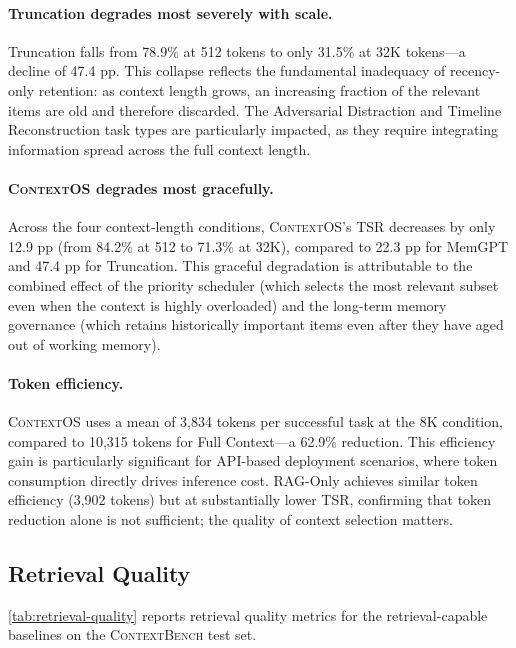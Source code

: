 \documentclass[review,12pt]{elsarticle}
\newcommand{\contextos}{\textsc{ContextOS}}
\newcommand{\contextbench}{\textsc{ContextBench}}
\begin{document}
\paragraph{Truncation degrades most severely with scale.}
Truncation falls from 78.9\% at 512 tokens to only 31.5\% at 32K tokens—a
decline of 47.4 pp.  This collapse reflects the fundamental inadequacy of
recency-only retention: as context length grows, an increasing fraction of the
relevant items are old and therefore discarded.  The Adversarial Distraction and
Timeline Reconstruction task types are particularly impacted, as they require
integrating information spread across the full context length.

\paragraph{\contextos{} degrades most gracefully.}
Across the four context-length conditions, \contextos{}'s TSR decreases by only
12.9 pp (from 84.2\% at 512 to 71.3\% at 32K), compared to 22.3 pp for MemGPT
and 47.4 pp for Truncation.  This graceful degradation is attributable to the
combined effect of the priority scheduler (which selects the most relevant
subset even when the context is highly overloaded) and the long-term memory
governance (which retains historically important items even after they have
aged out of working memory).

\paragraph{Token efficiency.}
\contextos{} uses a mean of 3,834 tokens per successful task at the 8K
condition, compared to 10,315 tokens for Full Context—a 62.9\% reduction.
This efficiency gain is particularly significant for API-based deployment
scenarios, where token consumption directly drives inference cost.  RAG-Only
achieves similar token efficiency (3,902 tokens) but at substantially lower
TSR, confirming that token reduction alone is not sufficient; the quality of
context selection matters.

\subsection{Retrieval Quality}
\label{subsec:retrieval-quality}

\cref{tab:retrieval-quality} reports retrieval quality metrics for the
retrieval-capable baselines on the \contextbench{} test set.
\end{document}
